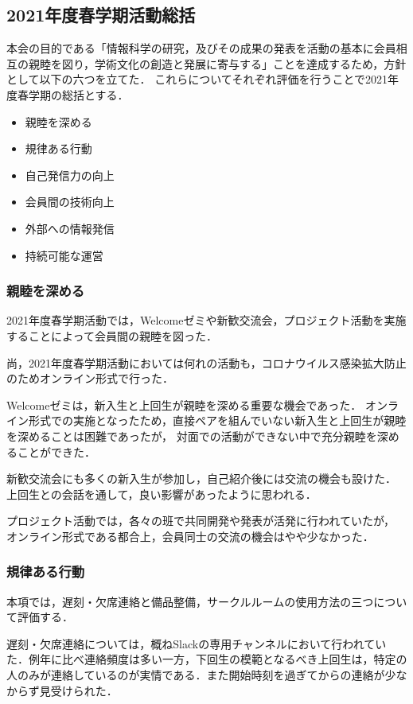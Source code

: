 \subsection*{2021年度春学期活動総括}


本会の目的である「情報科学の研究，及びその成果の発表を活動の基本に会員相互の親睦を図り，学術文化の創造と発展に寄与する」ことを達成するため，方針として以下の六つを立てた．
これらについてそれぞれ評価を行うことで2021年度春学期の総括とする．

\begin{itemize}
    \item 親睦を深める
    \item 規律ある行動
    \item 自己発信力の向上
    \item 会員間の技術向上
    \item 外部への情報発信
    \item 持続可能な運営
\end{itemize}

\subsubsection*{親睦を深める}
    2021年度春学期活動では，Welcomeゼミや新歓交流会，プロジェクト活動を実施することによって会員間の親睦を図った．

    尚，2021年度春学期活動においては何れの活動も，コロナウイルス感染拡大防止のためオンライン形式で行った．

    Welcomeゼミは，新入生と上回生が親睦を深める重要な機会であった．
    オンライン形式での実施となったため，直接ペアを組んでいない新入生と上回生が親睦を深めることは困難であったが，
    対面での活動ができない中で充分親睦を深めることができた．

    新歓交流会にも多くの新入生が参加し，自己紹介後には交流の機会も設けた．
    上回生との会話を通して，良い影響があったように思われる．

    プロジェクト活動では，各々の班で共同開発や発表が活発に行われていたが，
    オンライン形式である都合上，会員同士の交流の機会はやや少なかった．

\subsubsection*{規律ある行動}
    本項では，遅刻・欠席連絡と備品整備，サークルルームの使用方法の三つについて評価する．

    遅刻・欠席連絡については，概ねSlackの専用チャンネルにおいて行われていた．例年に比べ連絡頻度は多い一方，下回生の模範となるべき上回生は，特定の人のみが連絡しているのが実情である．また開始時刻を過ぎてからの連絡が少なからず見受けられた．

